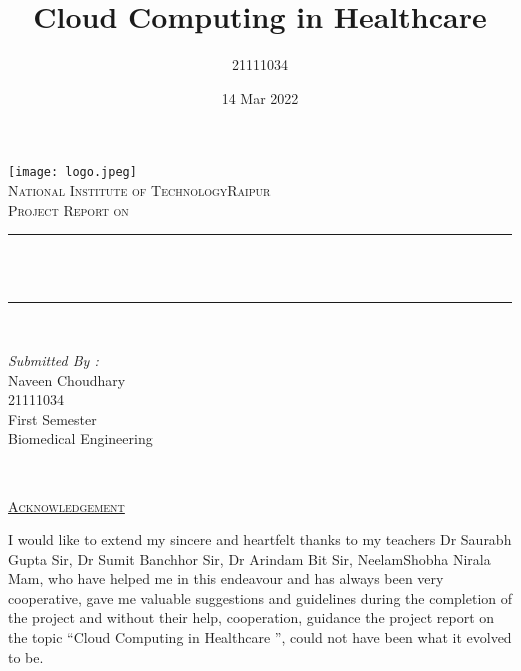 \documentclass[12pt]{article}
\title{Cloud Computing in Healthcare}								%
\author{21111034}								%
\date{14 Mar 2022}											%
\makeatletter
\let\thetitle\@title
\makeatother
\begin{document}

\begin{titlepage}
	\centering
    \vspace*{0.5 cm}
    \texttt{[image: logo.jpeg]}\\[1.0 cm]	%
    \textsc{\LARGE  National Institute of Technology\newline\newline Raipur}\\[2.0 cm]	%
	\textsc{\Large Project Report on}\\[0.5 cm]				%
	\rule{\linewidth}{0.2 mm} \\[0.4 cm]
	{ \huge \bfseries \thetitle}\\
	\rule{\linewidth}{0.2 mm} \\[1.0 cm]
	
	\begin{minipage}{1.0\textwidth}
			\begin{center} \large
			\emph{Submitted By :} \\
			Naveen Choudhary\\
            21111034\\
        First Semester\\
        Biomedical Engineering\\
		\end{center}
        
	\end{minipage}\\[2 cm]
	

\end{titlepage}

\newpage
\pagestyle{fancy}
\begin{center}
\textsc{\huge\underline{Acknowledgement}}   
\end{center}

\indent
\large

I would like to extend my sincere and heartfelt thanks to my teachers Dr Saurabh Gupta Sir, Dr Sumit Banchhor Sir, Dr Arindam Bit Sir, NeelamShobha Nirala Mam, who have helped me in this endeavour and has always been very cooperative, gave me valuable suggestions and guidelines during the completion of the project and without their help,  cooperation,  guidance the project report on the topic “Cloud Computing in Healthcare ”, could not have been what it evolved to be. 

\indent
\end{document}
